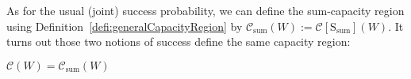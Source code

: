 


As for the usual (joint) success probability, we can define the sum-capacity region using Definition~\ref{defi:generalCapacityRegion} by $\mathcal{C}_{\text{sum}}(W) := \mathcal{C}[\mathrm{S}_{\text{sum}}](W)$. It turns out those two notions of success define the same capacity region:
\begin{proposition}
  \label{prop:CapaSumJoint}
  $\mathcal{C}(W) = \mathcal{C}_{\text{sum}}(W)$
\end{proposition}
